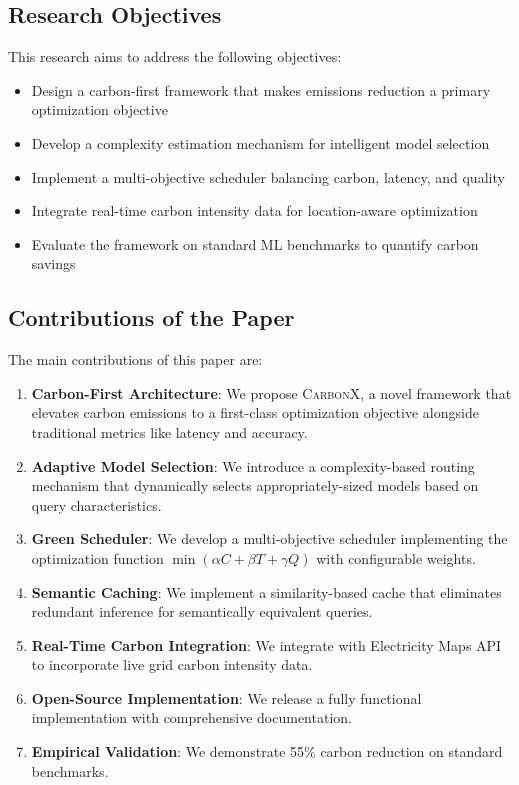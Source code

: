 \documentclass[conference]{IEEEtran}
\newcommand{\carbonx}{\textsc{CarbonX}}
\begin{document}
\subsection{Research Objectives}

This research aims to address the following objectives:

\begin{itemize}
    \item Design a carbon-first framework that makes emissions reduction a primary optimization objective
    \item Develop a complexity estimation mechanism for intelligent model selection
    \item Implement a multi-objective scheduler balancing carbon, latency, and quality
    \item Integrate real-time carbon intensity data for location-aware optimization
    \item Evaluate the framework on standard ML benchmarks to quantify carbon savings
\end{itemize}

\subsection{Contributions of the Paper}

The main contributions of this paper are:

\begin{enumerate}
    \item \textbf{Carbon-First Architecture}: We propose \carbonx{}, a novel framework that elevates carbon emissions to a first-class optimization objective alongside traditional metrics like latency and accuracy.
    
    \item \textbf{Adaptive Model Selection}: We introduce a complexity-based routing mechanism that dynamically selects appropriately-sized models based on query characteristics.
    
    \item \textbf{Green Scheduler}: We develop a multi-objective scheduler implementing the optimization function $\min(\alpha C + \beta T + \gamma Q)$ with configurable weights.
    
    \item \textbf{Semantic Caching}: We implement a similarity-based cache that eliminates redundant inference for semantically equivalent queries.
    
    \item \textbf{Real-Time Carbon Integration}: We integrate with Electricity Maps API to incorporate live grid carbon intensity data.
    
    \item \textbf{Open-Source Implementation}: We release a fully functional implementation with comprehensive documentation.
    
    \item \textbf{Empirical Validation}: We demonstrate 55\% carbon reduction on standard benchmarks.
\end{enumerate}
\end{document}
